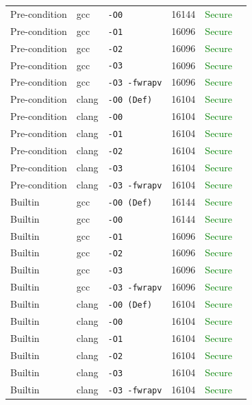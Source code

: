 \begin{table}[htbp]
\begin{tabular}{@{}lllcrl@{}}
Pre-condition & gcc & \texttt{-O0} & 16144 & \textcolor{green}{Secure}} \\
Pre-condition & gcc & \texttt{-O1} & 16096 & \textcolor{green}{Secure}} \\
Pre-condition & gcc & \texttt{-O2} & 16096 & \textcolor{green}{Secure}} \\
Pre-condition & gcc & \texttt{-O3} & 16096 & \textcolor{green}{Secure}} \\
Pre-condition & gcc & \texttt{-O3 -fwrapv} & 16096 & \textcolor{green}{Secure}} \\
Pre-condition & clang & \texttt{-O0 (Def)} & 16104 & \textcolor{green}{Secure}} \\
Pre-condition & clang & \texttt{-O0} & 16104 & \textcolor{green}{Secure}} \\
Pre-condition & clang & \texttt{-O1} & 16104 & \textcolor{green}{Secure}} \\
Pre-condition & clang & \texttt{-O2} & 16104 & \textcolor{green}{Secure}} \\
Pre-condition & clang & \texttt{-O3} & 16104 & \textcolor{green}{Secure}} \\
Pre-condition & clang & \texttt{-O3 -fwrapv} & 16104 & \textcolor{green}{Secure}} \\
\midrule
Builtin & gcc & \texttt{-O0 (Def)} & 16144 & \textcolor{green}{Secure}} \\
Builtin & gcc & \texttt{-O0} & 16144 & \textcolor{green}{Secure}} \\
Builtin & gcc & \texttt{-O1} & 16096 & \textcolor{green}{Secure}} \\
Builtin & gcc & \texttt{-O2} & 16096 & \textcolor{green}{Secure}} \\
Builtin & gcc & \texttt{-O3} & 16096 & \textcolor{green}{Secure}} \\
Builtin & gcc & \texttt{-O3 -fwrapv} & 16096 & \textcolor{green}{Secure}} \\
Builtin & clang & \texttt{-O0 (Def)} & 16104 & \textcolor{green}{Secure}} \\
Builtin & clang & \texttt{-O0} & 16104 & \textcolor{green}{Secure}} \\
Builtin & clang & \texttt{-O1} & 16104 & \textcolor{green}{Secure}} \\
Builtin & clang & \texttt{-O2} & 16104 & \textcolor{green}{Secure}} \\
Builtin & clang & \texttt{-O3} & 16104 & \textcolor{green}{Secure}} \\
Builtin & clang & \texttt{-O3 -fwrapv} & 16104 & \textcolor{green}{Secure}} \\
\midrule
\bottomrule \end{tabular} \end{table}

